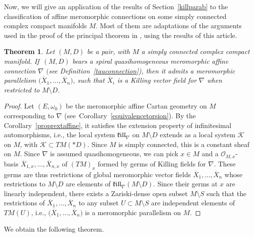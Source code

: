 \documentclass[10pt,a4paper]{amsart}
\numberwithin{equation}{section}
\newtheorem{Theorem}{Theorem}[section]
\begin{document}
Now, we will give an application of the results of Section~\ref{killparab} to the classification of affine meromorphic connections on some simply connected complex compact manifolds $M$. Most of them are adaptations of the arguments used in the proof of the principal theorem in \cite{BDM}, using the results of this article.

\begin{Theorem}\label{quasihomogeneousaffine} Let $(M,D)$ be a pair, with $M$ a simply connected complex compact manifold. If~$(M,D)$ bears a spiral quasihomogeneous meromorphic affine connection $\nabla$ $($see Definition~{\rm \ref{tauconnection})}, then it admits a meromorphic parallelism $\big(\overline{X}_1,\dots,\overline{X}_n\big)$, such that $\overline{X}_i$ is a Killing vector field for $\nabla$ when restricted to $M\setminus D$.

\end{Theorem}
\begin{proof}
 Let $(E,\omega_0)$ be the meromorphic affine Cartan geometry on $M$ corresponding to $\nabla$ (see~Corollary~\ref{equivalencetorsion}). By the Corollary~\ref{proprextaffine}, it satisfies the extension property of infinitesimal automorphisms, i.e., the local system $\mathfrak{k}\mathfrak{i}\mathfrak{l}\mathfrak{l}_{\nabla}$ on $M\setminus D$ extends as a local system $\mathcal{K}$ on $M$, with $\mathcal{K}\subset TM(* D)$. Since $M$ is simply connected, this is a constant sheaf on $M$. Since $\nabla$ is assumed quasihomogeneous, we can pick $x\in M$ and a $\mathcal{O}_{M,x}$-basis $\overline{X}_{1,x},\dots,\overline{X}_{n,x}$ of $(TM)_x$ formed by germs of Killing fields for $\nabla$. These germs are thus restrictions of global meromorphic vector fields $\overline{X}_1,\dots,\overline{X}_n$ whose restrictions to $M\setminus D$ are elements of $\mathfrak{k}\mathfrak{i}\mathfrak{l}\mathfrak{l}_\nabla(M\setminus D)$. Since their germs at $x$ are linearly independent, there exists a Zariski-dense open subset $M\setminus S$ such that the restrictions of $\overline{X}_1,\dots,\overline{X}_n$ to any subset $U\subset M\setminus S$ are independent elements of $TM(U)$, i.e., $\big(\overline{X}_1,\dots,\overline{X}_n\big)$ is a meromorphic parallelism on $M$.
\end{proof}

We obtain the following theorem.
\end{document}
